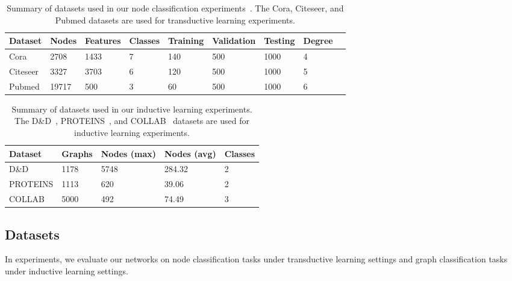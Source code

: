 \documentclass{article}
\begin{document}
\begin{table*}[t]
\centering \caption{Summary of datasets used in our node
classification
experiments~\citep{yang2016revisiting,zitnik2017predicting}. The
Cora, Citeseer, and Pubmed datasets are used for transductive
learning experiments.} \label{table:transdatasets}
\begin{tabularx}{\textwidth}{  X YYYYYYYY }
    \hline
    \textbf{Dataset} & \textbf{Nodes} &
    \textbf{Features} & \textbf{Classes} & \textbf{Training} &
    \textbf{Validation} & \textbf{Testing} & \textbf{Degree} \\ \hline\hline
    Cora      & 2708   & 1433 & 7   & 140   & 500 & 1000 & 4  \\ \hline
    Citeseer  & 3327   & 3703 & 6   & 120   & 500 & 1000 & 5  \\ \hline
    Pubmed    & 19717  & 500  & 3   & 60    & 500 & 1000 & 6  \\ \hline
    \hline
\end{tabularx}
\end{table*}

\begin{table*}[t]
\centering \caption{Summary of datasets used in our inductive
learning experiments. The D\&D~\citep{dobson2003distinguishing},
PROTEINS~\citep{borgwardt2005protein}, and
COLLAB~\citep{yanardag2015structural} datasets are used for
inductive learning experiments.} \label{table:inducdatasets}
\begin{tabularx}{\textwidth}{  X YYYY }
    \hline
    \textbf{Dataset} & \textbf{Graphs} &
    \textbf{Nodes (max)} & \textbf{Nodes (avg)} & \textbf{Classes} \\ \hline\hline
    D\&D      & 1178   & 5748 & 284.32  & 2  \\ \hline
    PROTEINS  & 1113   & 620  & 39.06   & 2  \\ \hline
    COLLAB    & 5000   & 492  & 74.49   & 3  \\ \hline
    \hline
\end{tabularx}
\end{table*}

\subsection{Datasets}

In experiments, we evaluate our networks on node classification
tasks under transductive learning settings and
graph classification tasks under inductive learning settings.
\end{document}
